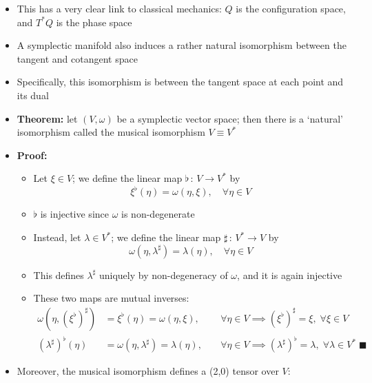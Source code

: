 \documentclass[12pt,a4paper]{article}
\numberwithin{equation}{section}
\begin{document}
\begin{itemize}
\begin{itemize}
		\end{itemize}
		\item This has a very clear link to classical mechanics: $Q$ is the configuration space, and $T^{*}Q$ is the phase space
		\item A symplectic manifold also induces a rather natural isomorphism between the tangent and cotangent space
		\item Specifically, this isomorphism is between the tangent space at each point and its dual
		\item \textbf{Theorem:} let $(V,\omega)$ be a symplectic vector space; then there is a `natural' isomorphism called the musical isomorphism $V\equiv V^{*}$
		\item \textbf{Proof:}
		\begin{itemize}
			\item Let $\xi\in V$; we define the linear map $\flat\,:\,V\to V^{*}$ by
			\begin{equation}
				\xi^{\flat}(\eta)=\omega(\eta,\xi),\quad\forall\eta\in V
			\end{equation}
			\item $\flat$ is injective since $\omega$ is non-degenerate
			\item Instead, let $\lambda\in V^{*}$; we define the linear map $\sharp\,:\,V^{*}\to V$ by
			\begin{equation}
				\omega(\eta,\lambda^{\sharp})=\lambda(\eta),\quad\forall \eta\in V
			\end{equation}
			\item This defines $\lambda^{\sharp}$ uniquely by non-degeneracy of $\omega$, and it is again injective
			\item These two maps are mutual inverses:
			\begin{equation}
				\begin{aligned}
					\omega(\eta,(\xi^{\flat})^{\sharp})&=\xi^{\flat}(\eta)=\omega(\eta,\xi),&\;&\forall \eta\in V\implies (\xi^{\flat})^{\sharp}=\xi,\;\forall \xi \in V\\
					(\lambda^{\sharp})^{\flat}(\eta)&=\omega(\eta,\lambda^{\sharp})=\lambda(\eta),&\;&\forall \eta \in V\implies (\lambda^{\sharp})^{\flat}=\lambda,\;\forall \lambda \in V^{*} \;\blacksquare
				\end{aligned}
			\end{equation}
		\end{itemize}
		\item Moreover, the musical isomorphism defines a (2,0) tensor over $V$:
		\begin{equation}

\end{equation}
\end{itemize}
\end{document}
